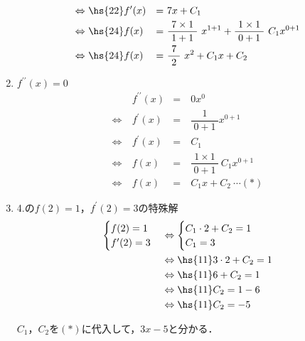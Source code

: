 \documentclass[a4paper,11pt]{ltjsarticle}
\begin{document}
\begin{enumerate}
\begin{equation*}
\begin{aligned}
    \Leftrightarrow\ & \hs{22} f^{\prime}(x)         &=&\ 7x+C_{1} \\
    \Leftrightarrow\ & \hs{24} f(x)                  &=&\ \dfrac{7 \times 1}{\ 1+1\ }\ x^{1+1}+\dfrac{1 \times 1}{\ 0+1\ }\ C_{1}x^{0+1} \\
    \Leftrightarrow\ & \hs{24} f(x)                  &=&\ \dfrac{7}{\ 2\ }\ x^{2}+C_{1}x+C_{2}
  \end{aligned}
\end{equation*}
  \item $f^{\prime \prime}(x)=0$
\begin{equation*}
  \begin{aligned}
    \ & f^{\prime \prime}(x) &=&\ 0x^{0} \\
    \Leftrightarrow\ & f^{\prime}(x) &=&\ \dfrac{1}{\ 0+1\ }x^{0+1} \\
    \Leftrightarrow\ & f^{\prime}(x) &=&\ C_{1} \\
    \Leftrightarrow\ & f(x) &=&\ \dfrac{1 \times 1}{\ 0+1\ }\ C_{1}x^{0+1} \\
    \Leftrightarrow\ & f(x) &=&\ C_{1}x+C_{2}\ \cdots (\ast)
  \end{aligned}
\end{equation*}
  \item 4.の$f(2)=1$，$f^{\prime}(2)=3$の特殊解
\begin{equation*}
  \begin{aligned}
    \begin{cases}
      f(2)=1 \\
      f^{\prime}(2)=3
    \end{cases}
    &\Leftrightarrow
    \begin{cases}
      C_{1} \cdot 2+C_{2}=1 \\
      C_{1}=3
    \end{cases} \\
    &\Leftrightarrow \hs{11} 3 \cdot 2+C_{2}=1 \\
    &\Leftrightarrow \hs{11} 6+C_{2}=1 \\
    &\Leftrightarrow \hs{11} C_{2}=1-6 \\
    &\Leftrightarrow \hs{11} C_{2}=-5
  \end{aligned}
\end{equation*}

\begin{center}
  $C_{1}$，$C_{2}$を$(\ast)$に代入して，$3x-5$と分かる．
\end{center}

\end{enumerate}
\end{document}

